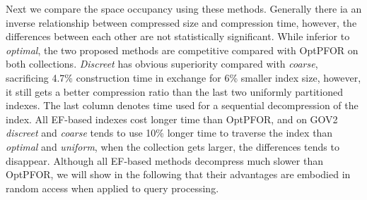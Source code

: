 \documentclass[runningheads,a4paper]{llncs}
\begin{document}
Next we compare the space occupancy using these methods.
Generally there ia an inverse relationship between compressed size and compression time, however, the differences between each other are not statistically significant.
While inferior to \textit{optimal}, the two proposed methods are competitive compared with OptPFOR on both collections.
\textit{Discreet} has obvious superiority compared with \textit{coarse}, sacrificing 4.7\% construction time in exchange for 6\% smaller index size, however, it still gets a better compression ratio than the last two uniformly partitioned indexes.
The last column denotes time used for a sequential decompression of the index.
All EF-based indexes cost longer time than OptPFOR, and on GOV2 \textit{discreet} and \textit{coarse} tends to use 10\% longer time to traverse the index than \textit{optimal} and \textit{uniform}, when the collection gets larger, the differences tends to disappear.
Although all EF-based methods decompress much slower than OptPFOR, we will show in the following that their advantages are embodied in random access when applied to query processing.
\end{document}
